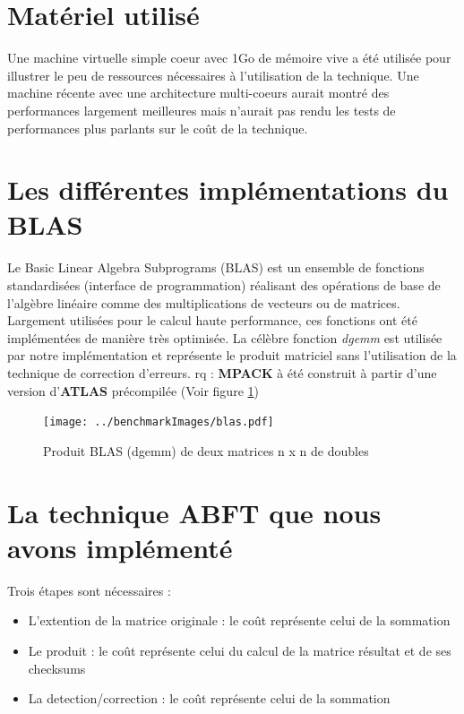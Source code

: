 \documentclass[a4paper, 10pt]{report}
\begin{document}
\section{Matériel utilisé}
Une machine virtuelle simple coeur avec 1Go de mémoire vive a été utilisée pour illustrer le peu de ressources nécessaires à l'utilisation de la technique.\newline
Une machine récente avec une architecture multi-coeurs aurait montré des performances largement meilleures mais n'aurait pas rendu les tests de performances plus parlants
sur le co\^ut de la technique.

\section{Les différentes implémentations du BLAS}
Le Basic Linear Algebra Subprograms (BLAS) est un ensemble de fonctions standardisées (interface de programmation) réalisant des opérations de base de l'algèbre linéaire comme des multiplications de vecteurs ou de matrices. Largement utilisées pour le calcul haute performance, ces fonctions ont été implémentées de manière très optimisée.\newline
La célèbre fonction \textit{dgemm} est utilisée par notre implémentation et représente le produit matriciel sans l'utilisation de la technique de correction d'erreurs.\newline
rq : \textbf{MPACK} \cite{MPACK} à été construit à partir d'une version d'\textbf{ATLAS} \cite{ATLAS} précompilée\newline
(Voir figure \ref{fig:blas})
\begin{figure}
\center
\texttt{[image: ../benchmarkImages/blas.pdf]}
\caption{Produit BLAS (dgemm) de deux matrices n x n de doubles}
\label{fig:blas}
\end{figure}

\section{La technique ABFT \cite{Huang} que nous avons implémenté}
Trois étapes sont nécessaires :
\begin{itemize}
\item L'extention de la matrice originale : le co\^ut représente celui de la sommation
\item Le produit : le co\^ut représente celui du calcul de la matrice résultat et de ses checksums
\item La detection/correction : le co\^ut représente celui de la sommation
\end{itemize}
\end{document}
